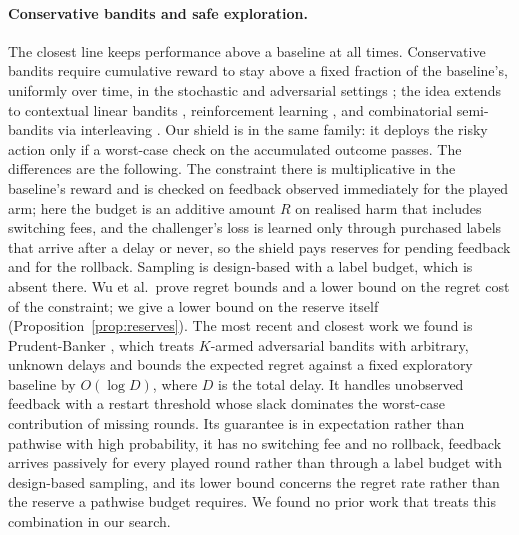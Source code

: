 \documentclass{article}
\theoremstyle{plain}
\theoremstyle{definition}
\begin{document}
\paragraph{Conservative bandits and safe exploration.}
The closest line keeps performance above a baseline at all times. Conservative bandits require cumulative reward to stay above a fixed fraction of the baseline's, uniformly over time, in the stochastic and adversarial settings \cite{wu2016conservative}; the idea extends to contextual linear bandits \cite{kazerouni2017conservative}, reinforcement learning \cite{garcelon2020conservative}, and combinatorial semi-bandits via interleaving \cite{katariya2019conservative}. Our shield is in the same family: it deploys the risky action only if a worst-case check on the accumulated outcome passes. The differences are the following. The constraint there is multiplicative in the baseline's reward and is checked on feedback observed immediately for the played arm; here the budget is an additive amount $R$ on realised harm that includes switching fees, and the challenger's loss is learned only through purchased labels that arrive after a delay or never, so the shield pays reserves for pending feedback and for the rollback. Sampling is design-based with a label budget, which is absent there. Wu et al.\ prove regret bounds and a lower bound on the regret cost of the constraint; we give a lower bound on the reserve itself (Proposition~\ref{prop:reserves}). The most recent and closest work we found is Prudent-Banker \cite{hu2026prudent}, which treats $K$-armed adversarial bandits with arbitrary, unknown delays and bounds the expected regret against a fixed exploratory baseline by $O(\log D)$, where $D$ is the total delay. It handles unobserved feedback with a restart threshold whose slack dominates the worst-case contribution of missing rounds. Its guarantee is in expectation rather than pathwise with high probability, it has no switching fee and no rollback, feedback arrives passively for every played round rather than through a label budget with design-based sampling, and its lower bound concerns the regret rate rather than the reserve a pathwise budget requires. We found no prior work that treats this combination in our search.
\end{document}
